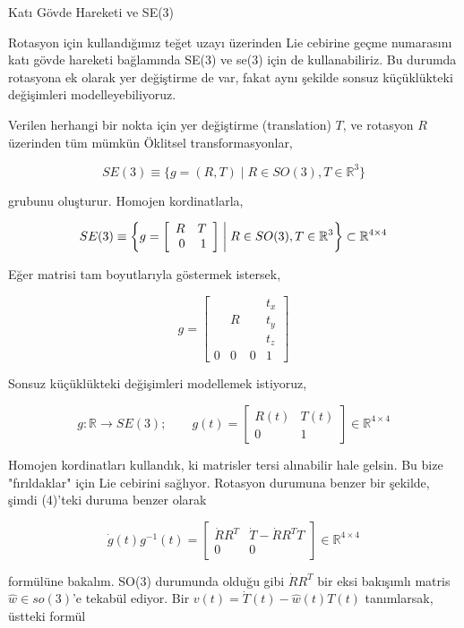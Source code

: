 \documentclass[12pt,fleqn]{article}\usepackage{../../common}
\begin{document}
Katı Gövde Hareketi ve SE(3)

Rotasyon için kullandığımız teğet uzayı üzerinden Lie cebirine geçme numarasını
katı gövde hareketi bağlamında SE(3) ve se(3) için de kullanabiliriz. Bu durumda
rotasyona ek olarak yer değiştirme de var, fakat aynı şekilde sonsuz
küçüklükteki değişimleri modelleyebiliyoruz.

Verilen herhangi bir nokta için yer değiştirme (translation) $T$, ve rotasyon
$R$ üzerinden tüm mümkün Öklitsel transformasyonlar,

$$ SE(3) \equiv \{ g = (R,T) \mid R \in SO(3), T \in \mathbb{R}^3 \}  $$

grubunu oluşturur. Homojen kordinatlarla, 

$$ 
SE(3) \equiv \bigg\{
g =
\left[\begin{array}{rrr}
R & T \\ 0 & 1
\end{array}\right] 
\biggm\vert
R \in SO(3), T \in \mathbb{R}^3 
\bigg\}
\subset \mathbb{R}^{4 \times 4}
 $$

Eğer matrisi tam boyutlarıyla göstermek istersek,


$$
g=\left[\begin{array}{ccc|c}
 & & & t_x \\ 
 & R & & t_y \\ 
 & & &  t_z \\ 
\hline
0 & 0 & 0 & 1 
\end{array}\right]
$$

Sonsuz küçüklükteki değişimleri modellemek istiyoruz, 

$$ 
g: \mathbb{R} \to SE(3) ; \qquad
g(t) = \left[\begin{array}{rrr}
R(t) & T(t) \\ 0 & 1
\end{array}\right]  \in \mathbb{R}^{4 \times 4}
 $$

Homojen kordinatları kullandık, ki matrisler tersi alınabilir hale gelsin.
Bu bize "fırıldaklar" için Lie cebirini sağlıyor. Rotasyon durumuna benzer
bir şekilde, şimdi (4)'teki duruma benzer olarak

$$ \dot{g}(t) g^{-1}(t) = 
\left[\begin{array}{rrr}
\dot{R}R^T & \dot{T}-\dot{R}R^TT \\ 0 & 0 
\end{array}\right] \in \mathbb{R}^{4 \times 4}
$$

formülüne bakalım. SO(3) durumunda olduğu gibi $\dot{R}R^T$ bir eksi 
bakışımlı matris $\hat{w} \in so(3)$'e tekabül ediyor. Bir $v(t) =
\dot{T}(t) - \hat{w}(t)T(t)$  tanımlarsak, üstteki formül
\end{document}
